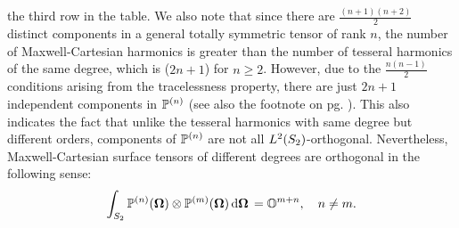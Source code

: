  the third row in the table. We also note that since there are $\frac{(n+1)(n+2)}{2}$ distinct components in a general 
 totally symmetric tensor of rank $n$, the number of Maxwell-Cartesian harmonics is greater than the number of tesseral 
 harmonics of the same degree, which is ($2n + 1$) for $n \geq 2$. However, due to the $\frac{n(n-1)}{2}$ conditions 
 arising from the tracelessness property, there are just $2n + 1$ independent components in $\PP$ (see also the footnote 
 on pg. \pageref{pg:indepc}). This also indicates the fact that unlike the tesseral harmonics with same degree but
 different orders, components of $\PP$ are not all $\Lp[2](\Sphere)$-orthogonal. Nevertheless, Maxwell-Cartesian surface
  tensors of different degrees are orthogonal in the following sense:
\begin{equation}\label{eq:OG}
  \intA{\PP[n](\bomega) \otimes \PP[m](\bomega)} = \mathbb{O}^{m+n},\quad n\neq m.
\end{equation}

